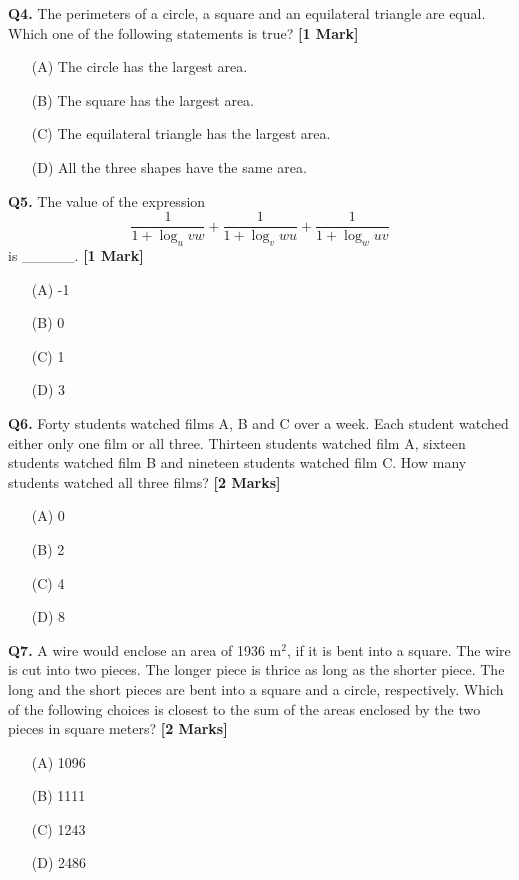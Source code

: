 \documentclass[11pt]{article}
\newcommand{\questiona}[2]{
    \noindent\textbf{Q#2.} #1 \hfill \textbf{[1 Mark]}
}
\newcommand{\questionb}[2]{
    \noindent\textbf{Q#2.} #1 \hfill \textbf{[2 Marks]}
}
\begin{document}
\questiona{The perimeters of a circle, a square and an equilateral triangle are equal. Which one of the following statements is true?}{4}
\begin{enumerate}
    \item[(A)] The circle has the largest area.  
    \item[(B)] The square has the largest area.  
    \item[(C)] The equilateral triangle has the largest area.  
    \item[(D)] All the three shapes have the same area.  
\end{enumerate}
\vspace{0.5cm}

\questiona{The value of the expression \[ \frac{1}{1+\log_u vw} + \frac{1}{1+\log_v wu} + \frac{1}{1+\log_w uv} \] is \_\_\_\_\_.}{5}
\begin{enumerate}
    \item[(A)] -1  
    \item[(B)] 0  
    \item[(C)] 1  
    \item[(D)] 3  
\end{enumerate}
\vspace{0.5cm}

\questionb{Forty students watched films A, B and C over a week. Each student watched either only one film or all three. Thirteen students watched film A, sixteen students watched film B and nineteen students watched film C. How many students watched all three films?}{6}
\begin{enumerate}
    \item[(A)] 0  
    \item[(B)] 2  
    \item[(C)] 4  
    \item[(D)] 8  
\end{enumerate}
\vspace{0.5cm}

\questionb{A wire would enclose an area of 1936 m\(^2\), if it is bent into a square. The wire is cut into two pieces. The longer piece is thrice as long as the shorter piece. The long and the short pieces are bent into a square and a circle, respectively. Which of the following choices is closest to the sum of the areas enclosed by the two pieces in square meters?}{7}
\begin{enumerate}
    \item[(A)] 1096  
    \item[(B)] 1111  
    \item[(C)] 1243  
    \item[(D)] 2486  
\end{enumerate}
\vspace{0.5cm}
\end{document}
